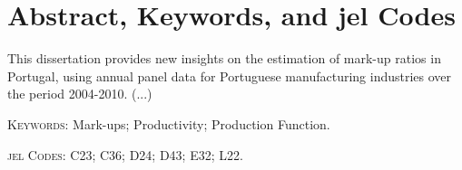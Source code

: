 \documentclass [12pt,a4paper,oneside]{article}
\begin{document}
\section*{Abstract, Keywords, and \gls{jel} Codes}

This dissertation provides new insights on the estimation of mark-up ratios in Portugal, using annual panel data for Portuguese manufacturing industries over the period 2004-2010. (...)

\textsc{Keywords}: Mark-ups; Productivity; Production Function.

\textsc{\gls{jel} Codes}: C23; C36; D24; D43; E32; L22.


	\newpage %
	\thispagestyle{plain}%
	\renewcommand*\contentsname{\hfill\normalfont\scshape\normalsize Table of Contents \hfill}
\tableofcontents

	\newpage %
	\thispagestyle{plain}%
	\renewcommand*\listfigurename{\hfill\normalfont\scshape\normalsize List of Figures \hfill}
\listoffigures

	\newpage %
	\thispagestyle{plain}%
	\renewcommand*\listtablename{\hfill\normalfont\scshape\normalsize List of Tables \hfill}
\listoftables
\end{document}
